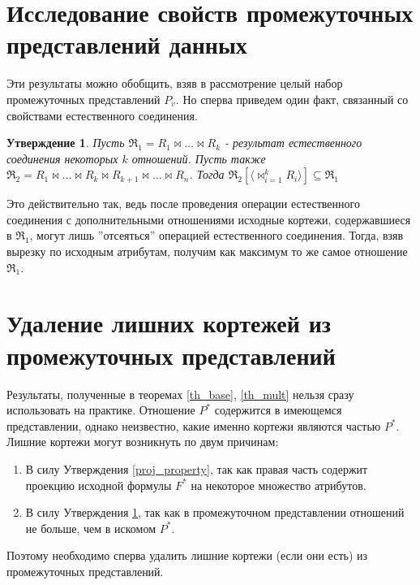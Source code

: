 \documentclass[10pt,a4paper]{article}
\newtheorem{statement}{Утверждение}
\begin{document}
\section{Исследование свойств промежуточных представлений данных}





Эти результаты можно обобщить, взяв в рассмотрение целый набор промежуточных
представлений $P_v$. Но сперва приведем один факт, связанный со свойствами
естественного соединения.

\begin{statement}
Пусть $\Re_1 = R_1 \bowtie \dots \bowtie R_k$ - результат естественного
соединения некоторых $k$ отношений. Пусть также $\Re_2 = R_1 \bowtie \dots
\bowtie R_k \bowtie R_{k+1} \bowtie \dots \bowtie R_{n}$. 
Тогда $\Re_2 [\langle \bowtie_{i=1}^{k} R_i \rangle] \subseteq \Re_1$
\label{join_property}
\end{statement}

Это действительно так, ведь после проведения операции естественного соединения
с дополнительными отношениями исходные кортежи, содержавшиеся в $\Re_1$, могут
лишь ''отсеяться'' операцией естественного соединения. Тогда, взяв вырезку по
исходным атрибутам, получим как максимум то же самое отношение $\Re_1$.





\section{Удаление лишних кортежей из промежуточных представлений}

Результаты, полученные в теоремах \ref{th_base}, \ref{th_mult} нельзя сразу
использовать на практике. Отношение $P^{\ast}$ содержится в имеющемся
представлении, однако неизвестно, какие именно кортежи являются частью
$P^{\ast}$. Лишние кортежи могут возникнуть по двум причинам:
\begin{enumerate}
  \item В силу Утверждения \ref{proj_property}, так как правая часть содержит
  проекцию исходной формулы $F^{\ast}$ на некоторое множество атрибутов.
  \item В силу Утверждения \ref{join_property}, так как в промежуточном
  представлении отношений не больше, чем в искомом $P^{\ast}$.
\end{enumerate}
Поэтому необходимо сперва удалить лишние кортежи (если они есть) из
промежуточных представлений.




\end{document}
